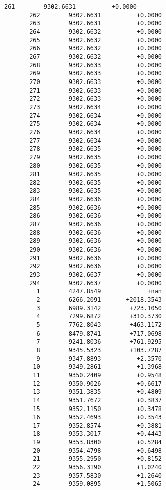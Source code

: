 \documentclass[11pt]{article}
\begin{document}
\begin{Verbatim}[commandchars=\\\{\}]
       261        9302.6631          +0.0000
       262        9302.6631          +0.0000
       263        9302.6631          +0.0000
       264        9302.6632          +0.0000
       265        9302.6632          +0.0000
       266        9302.6632          +0.0000
       267        9302.6632          +0.0000
       268        9302.6633          +0.0000
       269        9302.6633          +0.0000
       270        9302.6633          +0.0000
       271        9302.6633          +0.0000
       272        9302.6633          +0.0000
       273        9302.6634          +0.0000
       274        9302.6634          +0.0000
       275        9302.6634          +0.0000
       276        9302.6634          +0.0000
       277        9302.6634          +0.0000
       278        9302.6635          +0.0000
       279        9302.6635          +0.0000
       280        9302.6635          +0.0000
       281        9302.6635          +0.0000
       282        9302.6635          +0.0000
       283        9302.6635          +0.0000
       284        9302.6636          +0.0000
       285        9302.6636          +0.0000
       286        9302.6636          +0.0000
       287        9302.6636          +0.0000
       288        9302.6636          +0.0000
       289        9302.6636          +0.0000
       290        9302.6636          +0.0000
       291        9302.6636          +0.0000
       292        9302.6636          +0.0000
       293        9302.6637          +0.0000
       294        9302.6637          +0.0000
         1        4247.8549             +nan
         2        6266.2091       +2018.3543
         3        6989.3142        +723.1050
         4        7299.6872        +310.3730
         5        7762.8043        +463.1172
         6        8479.8741        +717.0698
         7        9241.8036        +761.9295
         8        9345.5323        +103.7287
         9        9347.8893          +2.3570
        10        9349.2861          +1.3968
        11        9350.2409          +0.9548
        12        9350.9026          +0.6617
        13        9351.3835          +0.4809
        14        9351.7672          +0.3837
        15        9352.1150          +0.3478
        16        9352.4693          +0.3543
        17        9352.8574          +0.3881
        18        9353.3017          +0.4443
        19        9353.8300          +0.5284
        20        9354.4798          +0.6498
        21        9355.2950          +0.8152
        22        9356.3190          +1.0240
        23        9357.5830          +1.2640
        24        9359.0895          +1.5065

\end{Verbatim}
\end{document}
